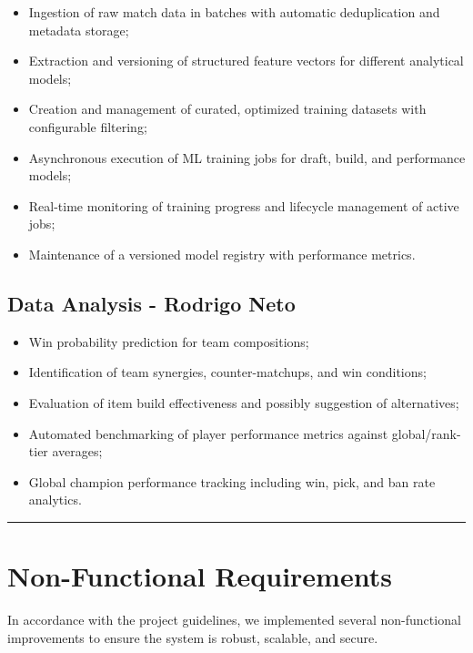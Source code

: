 \documentclass[11pt,a4paper]{article}
\begin{document}
 \begin{itemize}
  \item Ingestion of raw match data in batches with automatic deduplication and metadata storage;
  \item Extraction and versioning of structured feature vectors for different analytical models;
  \item Creation and management of curated, optimized training datasets with configurable filtering;
  \item Asynchronous execution of ML training jobs for draft, build, and performance models;
  \item Real-time monitoring of training progress and lifecycle management of active jobs;
  \item Maintenance of a versioned model registry with performance metrics.
 \end{itemize}
 
 \subsection{Data Analysis - Rodrigo Neto}

 \begin{itemize}
  \item Win probability prediction for team compositions;
  \item Identification of team synergies, counter-matchups, and win conditions;
  \item Evaluation of item build effectiveness and possibly suggestion of alternatives;
  \item Automated benchmarking of player performance metrics against global/rank-tier averages;
  \item Global champion performance tracking including win, pick, and ban rate analytics.
 \end{itemize}

 \vspace{1cm}
 \hrule
 \vspace{1cm}

 \section{Non-Functional Requirements}
 
 In accordance with the project guidelines, we implemented several non-functional improvements to ensure the system is robust, scalable, and secure.
\end{document}
